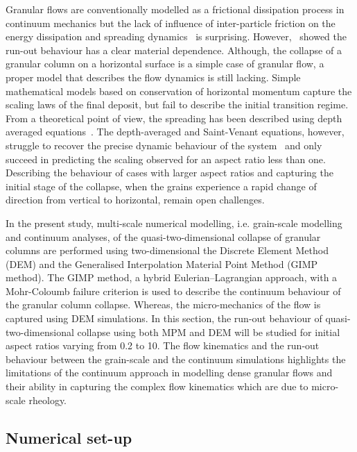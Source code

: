 Granular flows are conventionally modelled as a frictional dissipation process 
in continuum mechanics but the lack of influence of inter-particle friction on 
the energy dissipation and spreading dynamics~\citep{Lube2005} is surprising. 
However,~\citet{Kerswell2005} showed the run-out behaviour has a clear material 
dependence. Although, the collapse of a granular column on a horizontal surface 
is a simple case of granular flow, a proper model that describes the flow 
dynamics is still lacking. Simple mathematical models based on conservation of 
horizontal momentum capture the scaling laws of the final deposit, but fail to 
describe the initial transition regime. From a theoretical point of view, the 
spreading has been described using depth averaged 
equations~\citep{Kerswell2005,Larrieu2006}. The depth-averaged and 
Saint-Venant equations, however, struggle to recover the precise dynamic 
behaviour of the system~\citep{Warnett2013} and only succeed in predicting the 
scaling observed for an aspect ratio less than one. Describing the behaviour of 
cases with larger aspect ratios and capturing the initial stage of the 
collapse, when the grains experience a rapid change of direction from vertical 
to horizontal, remain open challenges.


In the present study, multi-scale numerical modelling, i.e. grain-scale 
modelling and continuum analyses, of the quasi-two-dimensional collapse of 
granular columns are performed using two-dimensional the Discrete Element 
Method (DEM) and the Generalised Interpolation Material Point Method (GIMP 
method). The GIMP method, a hybrid Eulerian--Lagrangian approach, with a 
Mohr-Coloumb failure criterion is used to describe the continuum behaviour of 
the granular column collapse. Whereas, the micro-mechanics of the flow is 
captured using DEM simulations. In this section, the run-out behaviour of 
quasi-two-dimensional collapse using both MPM and DEM will be studied for 
initial aspect ratios varying from 0.2 to 
10. The flow kinematics and the run-out behaviour between the grain-scale and 
the continuum simulations highlights the limitations of the continuum approach 
in modelling dense granular flows and their ability in capturing the complex 
flow kinematics which are due to micro-scale rheology.

\subsection{Numerical set-up}


